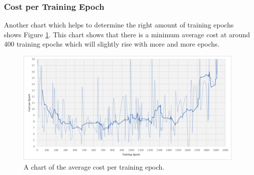 \documentclass[MGS,Master,english]{twbook}%
\begin{document}
\subsubsection{Cost per Training Epoch}
Another chart which helps to determine the right amount of training epochs shows Figure \ref{fig::vae::costPerEpoch}. This chart shows that there is a minimum average cost at around 400 training epochs which will slightly rise with more and more epochs. 
\begin{figure}[!ht]
	\centering
	\includegraphics[width=1.0\linewidth]{PICs/trained_vae/cost_per_epoch}
	\caption{A chart of the average cost per training epoch.} \label{fig::vae::costPerEpoch}
\end{figure}
\end{document}

